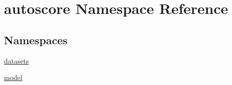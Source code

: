 \hypertarget{namespaceautoscore}{}\section{autoscore Namespace Reference}
\label{namespaceautoscore}
\subsection*{Namespaces}
\begin{DoxyCompactItemize}
\item 
 \hyperlink{namespaceautoscore_1_1datasets}{datasets}
\item 
 \hyperlink{namespaceautoscore_1_1model}{model}
\end{DoxyCompactItemize}
